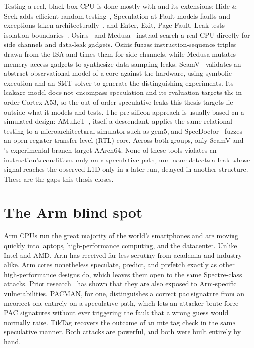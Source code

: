 Testing a real, black-box CPU is done mostly with \revizor{} and its extensions: Hide \& Seek
adds efficient random testing~\cite{hide_seek}, Speculation at Fault models faults and exceptions taken
architecturally~\cite{speculation_fault}, and Enter, Exit, Page Fault, Leak tests isolation
boundaries~\cite{isolation}. Osiris~\cite{osiris} and Medusa~\cite{transynther} instead search a
real CPU directly for side channels and data-leak gadgets. Osiris fuzzes instruction-sequence
triples drawn from the ISA and times them for side channels, while Medusa mutates memory-access
gadgets to synthesize data-sampling leaks. ScamV~\cite{scamv} validates an abstract observational model of a core against the
hardware, using symbolic execution and an SMT solver to generate the distinguishing experiments. Its
leakage model does not encompass speculation and its evaluation targets the in-order Cortex-A53, so
the out-of-order speculative leaks this thesis targets lie outside what it models and tests. The pre-silicon approach is usually based on a simulated
design: AMuLeT~\cite{amulet}, itself a \revizor{} descendant, applies the same relational testing
to a microarchitectural simulator such as gem5, and SpecDoctor~\cite{specdoctor} fuzzes an open
register-transfer-level (RTL) core. Across both groups, only ScamV and \revizor{}'s experimental
branch target AArch64. None of these tools violates an instruction's conditions only on a
speculative path, and none detects a leak whose signal reaches the observed L1D only in a later
run, delayed in another structure. These are the gaps this thesis closes.

\section{The Arm blind spot}
\label{sec:intro-arm}

Arm CPUs run the great majority of the world's smartphones and are moving quickly into
laptops, high-performance computing, and the datacenter. Unlike Intel and AMD, Arm has
received far less scrutiny from academia and industry alike. Arm cores nonetheless speculate,
predict, and prefetch exactly as other high-performance designs do, which leaves them open to
the same Spectre-class attacks. Prior research~\cite{pacman,tiktag} has shown that they are
also exposed to Arm-specific vulnerabilities. PACMAN, for one, distinguishes a correct
\gls{pac} signature from an incorrect one entirely on a speculative path, which lets an
attacker brute-force PAC signatures without ever triggering the fault that a wrong guess would
normally raise. TikTag recovers the outcome of an \gls{mte} tag check in the same speculative
manner. Both attacks are powerful, and both were built entirely by hand.

